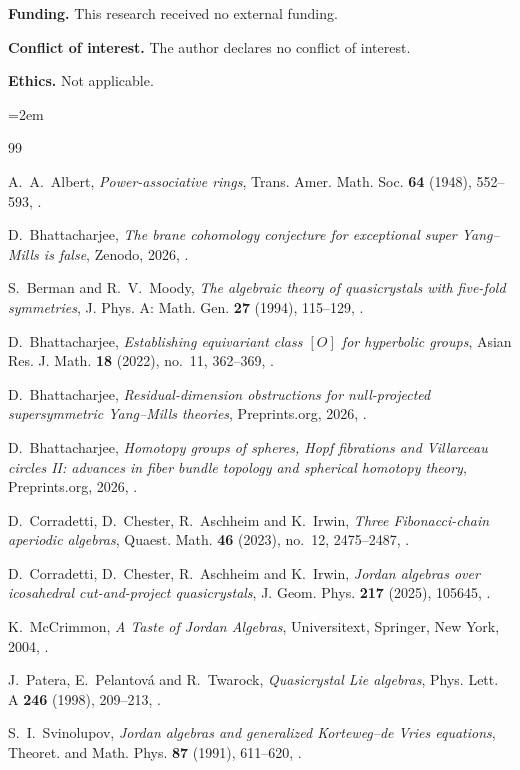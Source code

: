 \documentclass[11pt]{amsart}
\theoremstyle{definition}
\theoremstyle{remark}
\begin{document}
\noindent\textbf{Funding.} This research received no external funding.

\noindent\textbf{Conflict of interest.} The author declares no conflict of interest.

\noindent\textbf{Ethics.} Not applicable.

\emergencystretch=2em
\begin{thebibliography}{99}

 A.~A.~Albert, \emph{Power-associative rings}, Trans. Amer. Math. Soc. \textbf{64} (1948), 552--593, .

 D.~Bhattacharjee, \emph{The brane cohomology conjecture for exceptional super Yang--Mills is false}, Zenodo, 2026, .

 S.~Berman and R.~V.~Moody, \emph{The algebraic theory of quasicrystals with five-fold symmetries}, J. Phys. A: Math. Gen. \textbf{27} (1994), 115--129, .

 D.~Bhattacharjee, \emph{Establishing equivariant class $[O]$ for hyperbolic groups}, Asian Res. J. Math. \textbf{18} (2022), no.~11, 362--369, .

 D.~Bhattacharjee, \emph{Residual-dimension obstructions for null-projected supersymmetric Yang--Mills theories}, Preprints.org, 2026, .

 D.~Bhattacharjee, \emph{Homotopy groups of spheres, Hopf fibrations and Villarceau circles II: advances in fiber bundle topology and spherical homotopy theory}, Preprints.org, 2026, .

 D.~Corradetti, D.~Chester, R.~Aschheim and K.~Irwin, \emph{Three Fibonacci-chain aperiodic algebras}, Quaest. Math. \textbf{46} (2023), no.~12, 2475--2487, .

 D.~Corradetti, D.~Chester, R.~Aschheim and K.~Irwin, \emph{Jordan algebras over icosahedral cut-and-project quasicrystals}, J. Geom. Phys. \textbf{217} (2025), 105645, .

 K.~McCrimmon, \emph{A Taste of Jordan Algebras}, Universitext, Springer, New York, 2004, .

 J.~Patera, E.~Pelantov\'a and R.~Twarock, \emph{Quasicrystal Lie algebras}, Phys. Lett. A \textbf{246} (1998), 209--213, .

 S.~I.~Svinolupov, \emph{Jordan algebras and generalized Korteweg--de Vries equations}, Theoret. and Math. Phys. \textbf{87} (1991), 611--620, .

\end{thebibliography}
\end{document}
